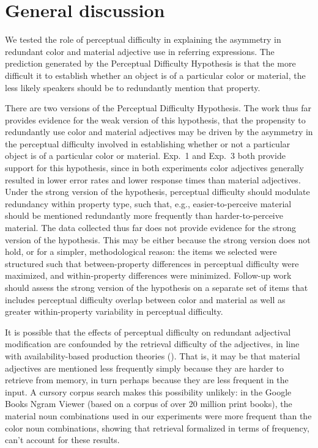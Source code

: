 \documentclass[12pt,letterpaper]{article}
\begin{document}
\section{General discussion} 

We tested the role of perceptual difficulty in explaining the asymmetry in redundant color and material adjective use in referring expressions. The prediction generated by the Perceptual Difficulty Hypothesis is that the more difficult it to establish whether an object is of a particular color or material, the less likely speakers should be to redundantly mention that property.

There are two versions of the Perceptual Difficulty Hypothesis. The work thus far provides evidence for the weak version of this hypothesis, that the propensity to redundantly use color and material adjectives may be driven by the asymmetry in the perceptual difficulty involved in establishing whether or not a particular object is of a particular color or material. Exp.~1 and Exp.~3 both provide support for this hypothesis, since in both experiments color adjectives generally resulted in lower error rates and lower response times than material adjectives. Under the strong version of the hypothesis, perceptual difficulty should modulate redundancy within property type, such that, e.g., easier-to-perceive material should be mentioned redundantly more frequently than  harder-to-perceive material. The data collected thus far does not provide evidence for the strong version of the hypothesis. This may be either because the strong version does not hold, or for a simpler, methodological reason: the items we selected were structured such that between-property differences in perceptual difficulty were maximized, and within-property differences were minimized. Follow-up work should assess the strong version of the hypothesis on a separate set of items that includes perceptual difficulty overlap between color and material as well as greater within-property variability in perceptual difficulty. 

It is possible that the effects of perceptual difficulty on redundant adjectival modification are confounded by the retrieval difficulty of the adjectives, in line with availability-based production theories (\citealt{Bock1987,FerreiraDell2000}). That is, it may be that material adjectives are mentioned less frequently simply because they are harder to retrieve from memory, in turn perhaps because they are less frequent in the input. A cursory corpus search makes this possibility unlikely: in the Google Books Ngram Viewer (based on a corpus of over 20 million print books), the material noun combinations used in our experiments were more frequent than the color noun combinations, showing that retrieval formalized in terms of frequency, can't account for these results.
\end{document}
